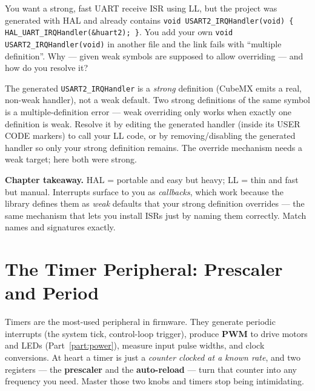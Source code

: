\documentclass[11pt,a4paper,oneside]{book}
\newcommand{\code}[1]{\texttt{#1}}
\begin{document}
\begin{exercise}
You want a strong, fast UART receive ISR using LL, but the project was generated
with HAL and already contains \code{void USART2\_IRQHandler(void) \{
HAL\_UART\_IRQHandler(\&huart2); \}}. You add your own
\code{void USART2\_IRQHandler(void)} in another file and the link fails with
``multiple definition''. Why --- given weak symbols are supposed to allow
overriding --- and how do you resolve it?
\end{exercise}
\begin{solution}
The generated \code{USART2\_IRQHandler} is a \emph{strong} definition (CubeMX
emits a real, non-weak handler), not a weak default. Two strong definitions of
the same symbol is a multiple-definition error --- weak overriding only works
when exactly one definition is weak. Resolve it by editing the generated handler
(inside its USER CODE markers) to call your LL code, or by removing/disabling the
generated handler so only your strong definition remains. The override mechanism
needs a weak target; here both were strong.
\end{solution}

\begin{keyidea}
\textbf{Chapter takeaway.} HAL = portable and easy but heavy; LL = thin and fast
but manual. Interrupts surface to you as \emph{callbacks}, which work because the
library defines them as \emph{weak} defaults that your strong definition
overrides --- the same mechanism that lets you install ISRs just by naming them
correctly. Match names and signatures exactly.
\end{keyidea}

\chapter{The Timer Peripheral: Prescaler and Period}
\label{ch:timer}

Timers are the most-used peripheral in firmware. They generate periodic
interrupts (the system tick, control-loop trigger), produce \textbf{PWM} to
drive motors and LEDs (Part~\ref{part:power}), measure input pulse widths, and
clock conversions. At heart a timer is just a \emph{counter clocked at a known
rate}, and two registers --- the \textbf{prescaler} and the \textbf{auto-reload}
--- turn that counter into any frequency you need. Master those two knobs and
timers stop being intimidating.
\end{document}
